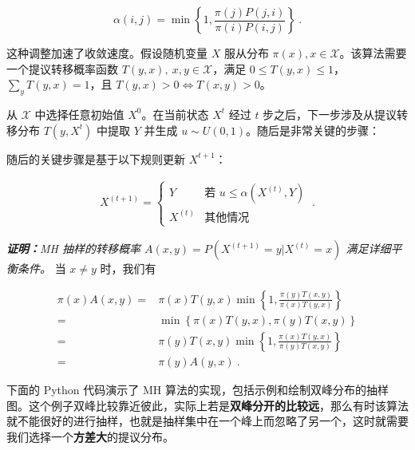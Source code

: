 \begin{equation}
\alpha(i, j) = \min \left\{ 1, \frac{\pi(j)P(j, i)}{\pi(i)P(i, j)} \right\}~.
\end{equation}

这种调整加速了收敛速度。假设随机变量 $X$ 服从分布 $\pi(x), x\in \mathcal{X}$。该算法需要一个提议转移概率函数 $T(y, x),\ x,y \in \mathcal {X}$，满足 $0 \leq T(y, x) \leq 1$，$\sum_y T(y, x) = 1$，且 $ T(y, x)>0 \Leftrightarrow T(x, y) >0 $。

从 $\mathcal{X}$ 中选择任意初始值 $X^0$。在当前状态 $X^t$ 经过 $t$ 步之后，下一步涉及从提议转移分布 $T(y, X^t)$ 中提取 $Y$ 并生成 $u\sim U (0,1)$。随后是非常关键的步骤：

随后的关键步骤是基于以下规则更新 $X^{t+1}$：

\begin{align}
   X^{(t+1)} = \begin{cases}
     Y & \text{若 } u \leq \alpha(X^{(t)}, Y) \\
     X^{(t)} & \text{其他情况} 
   \end{cases} ~.
\end{align}

\textsl{\textbf{证明：}MH 抽样的转移概率 $A(x,y) = P(X^{(t+1)} = y | X^{(t)} = x)$ 满足详细平衡条件。 } 当 $x\neq y$ 时，我们有

\begin{align}
\pi(x) A(x,y) =& \pi(x) T(y , x) \min \left\{ 1, \frac{\pi(y)T(x , y)}{\pi(x)T(y , x)} \right\}\\
=& \min \left\{ \pi(x)T(y , x), \pi(y)T(x , y) \right\}\\
=&\pi(y) T(x, y) \min \left\{ 1, \frac{\pi(x)T(y , x)}{\pi(y)T(x, y)} \right\}\\
=& \pi(y) A(y,x)~.
\end{align}

下面的 Python 代码演示了 MH 算法的实现，包括示例和绘制双峰分布的抽样图。这个例子双峰比较靠近彼此，实际上若是\textbf{双峰分开的比较远}，那么有时该算法就不能很好的进行抽样，也就是抽样集中在一个峰上而忽略了另一个，这时就需要我们选择一个\textbf{方差大}的提议分布。

